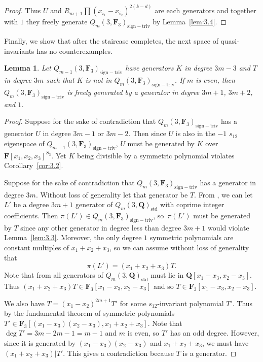 \documentclass[pdftex]{sigma}
\newtheorem{Lemma}[Theorem]{Lemma}
\theoremstyle{definition}
\numberwithin{equation}{section}
\newcommand{\std}{\mathrm{std}}
\newcommand{\siv}{\mathrm{sign-triv}}
\begin{document}
\begin{proof}
 Thus $U$ and $R_{m+1}\prod (x_{i_1}-x_{i_2})^{2(k-d)}$ are each generators and together with $1$ they freely generate $Q_m(3,\mathbf{F}_3)_{\siv}$ by Lemma~\ref{lem:3.4}.
\end{proof}

Finally, we show that after the staircase completes, the next space of quasi-invariants has no counterexamples.

\begin{Lemma}\label{backNon}
 Let $Q_{m-1}(3,\mathbf{F}_3)_{\siv}$ have generators $K$ in degree $3m-3$ and $T$ in degree $3m$ such that $K$ is not in $Q_{m}(3,\mathbf{F}_3)_{\siv}$. If $m$ is even, then $Q_{m}(3,\mathbf{F}_3)_{\siv}$ is freely generated by a generator in degree $3m+1$, $3m+2$, and $1$.
\end{Lemma}
\begin{proof}
 Suppose for the sake of contradiction that $Q_{m}(3,\mathbf{F}_3)_{\siv}$ has a generator $U$ in degree $3m-1$ or $3m-2$. Then since $U$ is also in the $-1$ $s_{12}$ eigenspace of $Q_{m-1}(3,\mathbf{F}_3)_{\siv}$, $U$ must be generated by $K$ over $\mathbf{F}[x_1,x_2,x_3]^{S_3}$. Yet $K$ being divisible by a symmetric polynomial violates Corollary~\ref{cor:3.2}.

 Suppose for the sake of contradiction that $Q_{m}(3,\mathbf{F}_3)_{\siv}$ has a generator in degree $3m$. Without loss of generality let that generator be $T$. From \cite{felder2001action}, we can let $L'$ be a degree $3m+1$ generator of $Q_m(3,\mathbf{Q})_{\std}$ with coprime integer coefficients. Then $\pi(L')\in Q_m(3,\mathbf{F}_3)_{\siv}$, so~$\pi(L')$ must be generated by $T$ since any other generator in degree less than degree $3m+1$ would violate Lemma~\ref{lem:3.3}. Moreover, the only degree $1$ symmetric polynomials are constant multiples of $x_1+x_2+x_3$, so we can assume without loss of generality that
 \[\pi(L')=(x_1+x_2+x_3)T.\]
 Note that from \cite{wang2022explicit} all generators of $Q_m(3,\mathbf{Q})_{\std}$ must lie in $\mathbf{Q}[x_1-x_3,x_2-x_3]$. Thus $(x_1+x_2+x_3)T\in\mathbf{F}_3[x_1-x_3,x_2-x_3]$ and so $T\in \mathbf{F}_3[x_1-x_3,x_2-x_3]$.

 We also have $T=(x_1-x_2)^{2m+1}T'$ for some $s_{12}$-invariant polynomial $T'$. Thus by the fundamental theorem of symmetric polynomials $T'\in \mathbf{F}_3[(x_1-x_3)(x_2-x_3),x_1+x_2+x_3]$. Note that $\deg T' = 3m-2m-1=m-1$ and $m$ is even, so $T'$ has an odd degree. However, since it is generated by $(x_1-x_3)(x_2-x_3)$ and $x_1+x_2+x_3$, we must have $(x_1+x_2+x_3)|T'$. This gives a contradiction because $T$ is a generator.
\end{proof}
\end{document}
